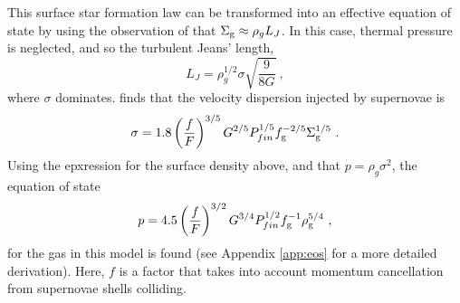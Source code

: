 This surface star formation law can be transformed into an effective equation of state by using the observation of \citet{schaye_model-independent_2001} that $\Sigma_\mathrm{g} \approx \rho_g L_J$.
In this case, thermal pressure is neglected, and so the turbulent Jeans' length,
\begin{equation}
\label{eqn:jeans}
L_J = \rho_g^{1/2} \sigma \sqrt{\frac{9}{8G}}~,
\end{equation}
where $\sigma$ dominates.
\citet{martizzi_supernova_2015} finds that the velocity dispersion injected by supernovae is
\begin{equation}
\label{eqn:martdisp}
\sigma = 1.8 \left(\frac{f}{F}\right)^{{3/5}} G^{{2/5}} P_{fin}^{{1/5}} f_\mathrm{g}^{{-2/5}} \Sigma_\mathrm{g}^{{1/5}}~.
\end{equation}
Using the epxression for the surface density above, and that $p = \rho_g \sigma^2$, the equation of state
\begin{equation}
\label{eqn:eos}
p = 4.5\left(\frac{f}{F}\right)^{{3/2}} G^{{3/4}} P_{fin}^{{1/2}} f_\mathrm{g}^{-1} \rho_\mathrm{g}^{{5/4}}~,
\end{equation}
for the gas in this model is found (see Appendix \ref{app:eos} for a more detailed derivation).
Here, $f$ is a factor that takes into account momentum cancellation from supernovae shells colliding.

